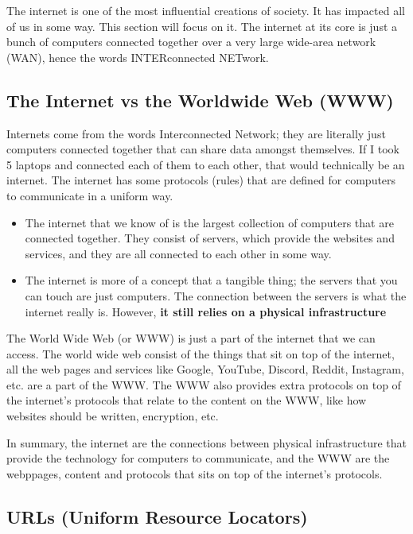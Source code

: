 \documentclass[../main.tex]{subfiles}
\begin{document}
The internet is one of the most influential creations of society. It has impacted all of us in some way. This section will focus on it. The internet at its core is just a bunch of computers connected together over a very large wide-area network (WAN), hence the words INTERconnected NETwork.

\subsection{The Internet vs the Worldwide Web (WWW)}

Internets come from the words Interconnected Network; they are literally just computers connected together that can share data amongst themselves. If I took 5 laptops and connected each of them to each other, that would technically be an internet. The internet has some protocols (rules) that are defined for computers to communicate in a uniform way.

\begin{itemize}
    \item The internet that we know of is the largest collection of computers that are connected together. They consist of servers, which provide the websites and services, and they are all connected to each other in some way.
    \item The internet is more of a concept that a tangible thing; the servers that you can touch are just computers. The connection between the servers is what the internet really is. However, \textbf{it still relies on a physical infrastructure}
\end{itemize}

The World Wide Web (or WWW) is just a part of the internet that we can access. The world wide web consist of the things that sit on top of the internet, all the web pages and services like Google, YouTube, Discord, Reddit, Instagram, etc. are a part of the WWW. The WWW also provides extra protocols on top of the internet's protocols that relate to the content on the WWW, like how websites should be written, encryption, etc.

In summary, the internet are the connections between physical infrastructure that provide the technology for computers to communicate, and the WWW are the webppages, content and protocols that sits on top of the internet's protocols.

\subsection{URLs (Uniform Resource Locators)}
\end{document}
